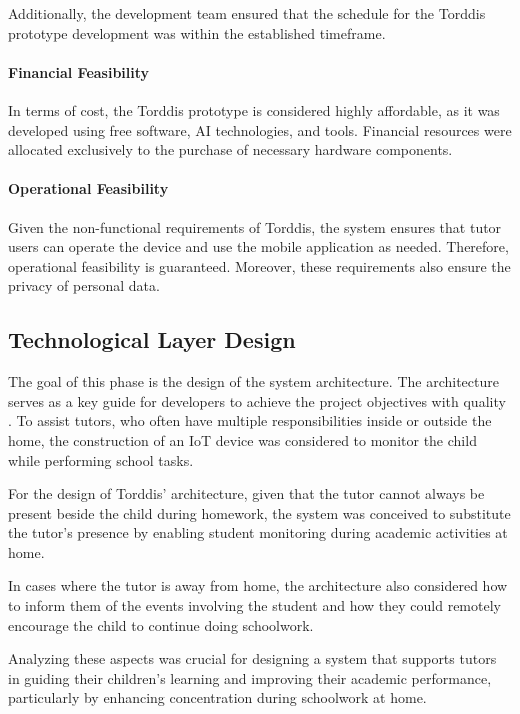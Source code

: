                 Additionally, the development team ensured that the schedule for the Torddis prototype development was within the established timeframe.
                
                \paragraph{Financial Feasibility}
                In terms of cost, the Torddis prototype is considered highly affordable, as it was developed using free software, AI technologies, and tools. Financial resources were allocated exclusively to the purchase of necessary hardware components.
                
                \paragraph{Operational Feasibility}
                Given the non-functional requirements of Torddis, the system ensures that tutor users can operate the device and use the mobile application as needed. Therefore, operational feasibility is guaranteed. Moreover, these requirements also ensure the privacy of personal data.
                
                \subsection{Technological Layer Design}
                The goal of this phase is the design of the system architecture. The architecture serves as a key guide for developers to achieve the project objectives with quality \citep{Liu2011Status}. To assist tutors, who often have multiple responsibilities inside or outside the home, the construction of an IoT device was considered to monitor the child while performing school tasks.
                
                For the design of Torddis’ architecture, given that the tutor cannot always be present beside the child during homework, the system was conceived to substitute the tutor's presence by enabling student monitoring during academic activities at home.
                
                In cases where the tutor is away from home, the architecture also considered how to inform them of the events involving the student and how they could remotely encourage the child to continue doing schoolwork.
                
                Analyzing these aspects was crucial for designing a system that supports tutors in guiding their children's learning and improving their academic performance, particularly by enhancing concentration during schoolwork at home.
                
